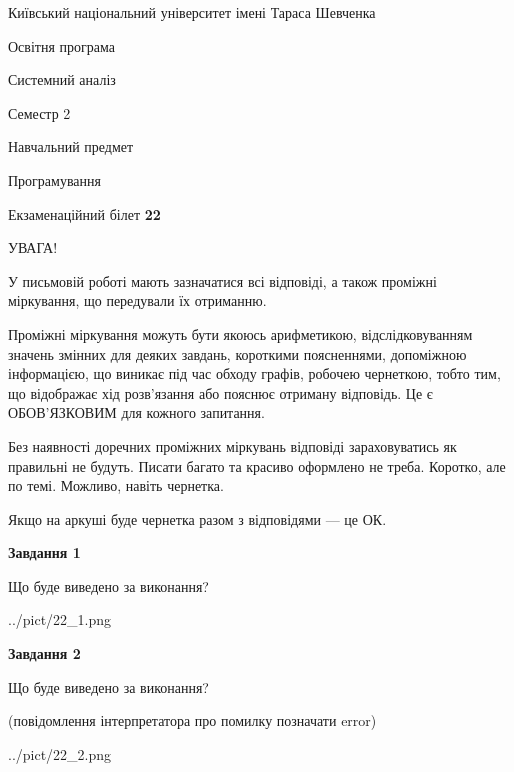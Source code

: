 \documentclass[12pt, ukrainian]{article}
\begin{document}
{{\begin {small}\par
{ \center  Київський національний університет імені Тараса Шевченка \par}
{\parbox {5 cm}{Освітня програма \hfill}{\parbox {7 cm}{Системний аналіз \hfill}}\parbox {6 cm}{\hfill Семестр 2}}\par
{\parbox {5 cm} {Навчальний предмет \hfill}\parbox {7 cm}{Програмування \hfill}\parbox {6cm}{\hfill}\par}\vspace{-7pt} \end{small}}{\center Екзаменаційний білет \No \textbf
{ 22 }\par}}
{
\begin {large}
УВАГА!

У письмовій роботі мають зазначатися всі відповіді, а також проміжні міркування, що передували їх отриманню.

Проміжні міркування можуть бути якоюсь арифметикою, відслідковуванням зна\-чень змінних для деяких завдань,
короткими поясненнями, допоміжною інформацією, що виникає під час обходу графів, робочею чернеткою,
тобто тим, що відображає хід розв’язання або пояснює отриману відповідь.
Це є ОБОВ’ЯЗКОВИМ для кожного запитання.

Без наявності доречних проміжних міркувань відповіді зараховуватись як правиль\-ні не будуть.
Писати багато та красиво оформлено не треба. Коротко, але по темі. Можли\-во, навіть чернетка.

Якщо на аркуші буде чернетка разом з відповідями --- це ОК.

\newpage

{\begin {center}\textbf{Завдання 1}\end {center}}\par
Що буде виведено за виконання?\par
\begin{center}
	{../pict/22_1.png}
\end{center}
\newpage

{\begin {center}\textbf{Завдання 2}\end {center}}\par
Що буде виведено за виконання?\par
 (повідомлення інтерпретатора про помилку позначати error)\par
\begin{center}
	{../pict/22_2.png}
\end{center}
\newpage


\end{large}}
\end{document}
